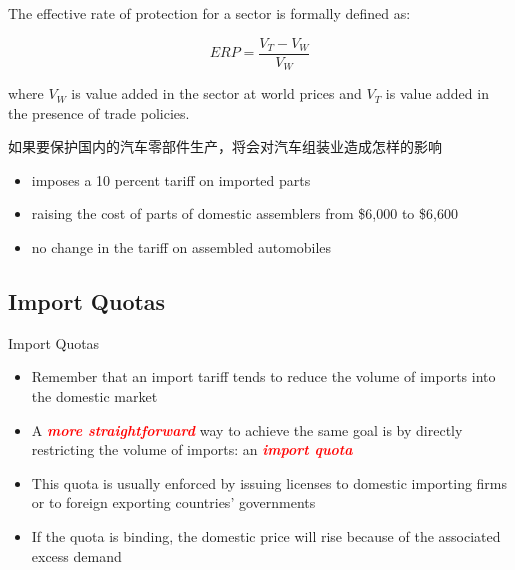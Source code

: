 \documentclass[10pt,hyperref={CJKbookmarks=true},xcolor=dvipsnames,aspectratio=169]{beamer}
\begin{document}
\begin{frame}
\begin{definition}[有效保护率]
The effective rate of protection for a sector is formally defined
as: 

\[
ERP=\frac{V_{T}-V_{W}}{V_{W}}
\]


where $V_{W}$ is value added in the sector at world prices and $V_{T}$
is value added in the presence of trade policies.
\end{definition}
\begin{block}{如果要保护国内的汽车零部件生产，将会对汽车组装业造成怎样的影响}
	\begin{itemize}
		\item imposes a 10 percent tariff on imported parts
		\item raising the cost of parts of domestic	assemblers from \$6,000 to \$6,600
		\item no change in the tariff on assembled automobiles
		
	\end{itemize}
\end{block}

\end{frame}



\subsection{Import Quotas}
\begin{frame}{Import Quotas}

\begin{itemize}
\item Remember that an import tariff tends to reduce the volume of imports
into the domestic market 
\item A \textbf{\textcolor{red}{\emph{more straightforward}}} way to achieve
the same goal is by directly restricting the volume of imports: an
\textbf{\textcolor{red}{\emph{import quota }}}
\item This quota is usually enforced by issuing licenses to domestic importing
firms or to foreign exporting countries’ governments 
\item If the quota is binding, the domestic price will rise because of the
associated excess demand
\end{itemize}
\end{frame}
\end{document}
